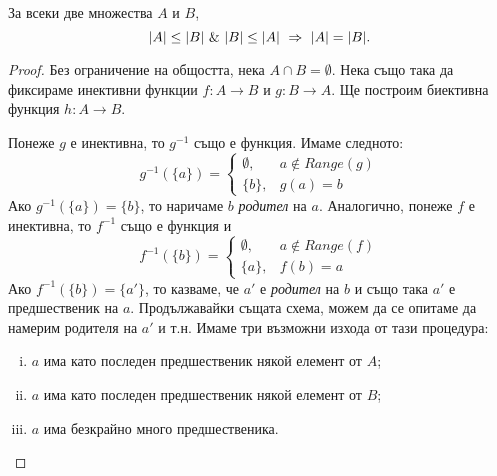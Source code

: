 \begin{thm}
  \label{th:k-s-b}
  За всеки две множества $A$ и $B$,
  \[\abs{A}\leq\abs{B}\ \&\ \abs{B}\leq\abs{A}\ \Rightarrow\ \abs{A} = \abs{B}.\]
\end{thm}
\begin{proof}
  Без ограничение на общостта, нека $A\cap B = \emptyset$.
  Нека също така да фиксираме инективни функции $f:A\rightarrow B$ и $g:B\rightarrow A$.
  Ще построим биективна функция $h:A\rightarrow B$.
  
  Понеже $g$ е инективна, то $g^{-1}$ също е функция. Имаме следното:
  \[
  g^{-1}(\{a\}) = 
  \begin{cases}
    \emptyset, & a \not\in Range(g)\\
    \{b\}, & g(a) = b 
  \end{cases}
  \]
  Ако $g^{-1}(\{a\}) = \{b\}$, то наричаме $b$ {\em родител} на $a$.
  Аналогично, понеже $f$ е инективна, то $f^{-1}$ също е функция и 
  \[
  f^{-1}(\{b\}) = 
  \begin{cases}
    \emptyset, & a \not\in Range(f)\\
    \{a\}, & f(b) = a 
  \end{cases}
  \]
  Ако $f^{-1}(\{b\}) = \{a'\}$, то казваме, че $a'$ е {\em родител} на $b$ и също така $a'$ е предшественик на $a$.
  Продължавайки същата схема, можем да се опитаме да намерим родителя на $a'$ и т.н.
  Имаме три възможни изхода от тази процедура:
  \begin{enumerate}[i)]
  \item
    $a$ има като последен предшественик някой елемент от $A$;
  \item
    $a$ има като последен предшественик някой елемент от $B$;
  \item
    $a$ има безкрайно много предшественика.
\end{enumerate}

\begin{figure}[htbp]
  \begin{subfigure}[b]{0.6\textwidth}
\end{subfigure}
\end{figure}
\end{proof}
